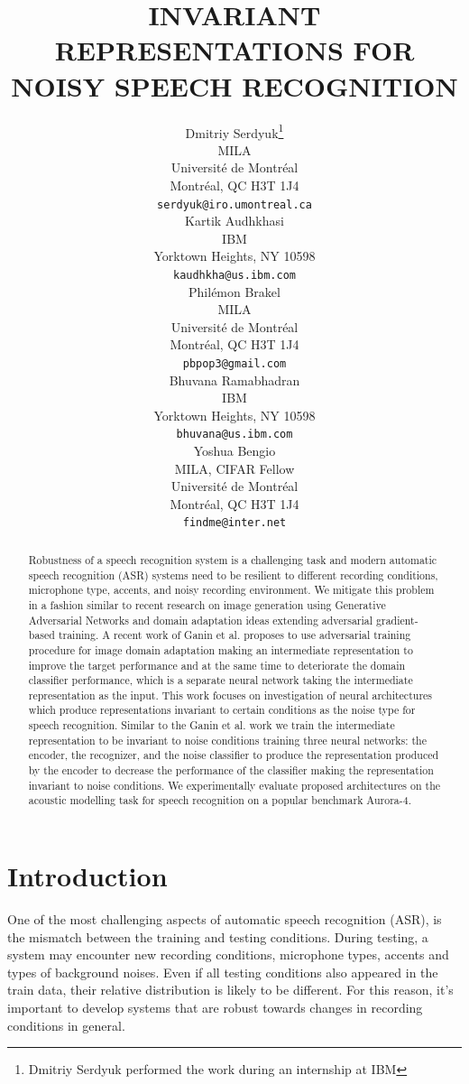 \documentclass{article}
\title{INVARIANT REPRESENTATIONS FOR NOISY SPEECH RECOGNITION}
\author{
  Dmitriy Serdyuk\thanks{Dmitriy Serdyuk performed the work 
    during an internship at IBM} \\
  MILA\\
  Universit\'e de Montr\'eal\\
  Montr\'eal, QC H3T 1J4 \\
  \texttt{serdyuk@iro.umontreal.ca} \\
  \And
  Kartik Audhkhasi \\
  IBM \\
  Yorktown Heights, NY 10598\\
  \texttt{kaudhkha@us.ibm.com} \\
  \And
  Phil\'emon Brakel \\
  MILA\\
  Universit\'e de Montr\'eal\\
  Montr\'eal, QC H3T 1J4 \\
  \texttt{pbpop3@gmail.com} \\
  \And
  Bhuvana Ramabhadran\\
  IBM \\
  Yorktown Heights, NY 10598\\
  \texttt{bhuvana@us.ibm.com} \\
  \And
  Yoshua Bengio\\
  MILA, CIFAR Fellow\\
  Universit\'e de Montr\'eal\\
  Montr\'eal, QC H3T 1J4 \\
  \texttt{findme@inter.net} \\
}
\begin{document}
%
\maketitle
%
\begin{abstract}
    Robustness of a speech recognition system is a challenging task and modern
    automatic speech recognition (ASR) systems need to be resilient to different recording conditions,
    microphone type, accents, and noisy recording environment. We mitigate
    this problem in a fashion similar to recent research on image generation using
    Generative Adversarial Networks and domain adaptation ideas extending
    adversarial gradient-based training. A recent work of Ganin et al. proposes to
    use adversarial training procedure for image domain adaptation making an intermediate
    representation to improve the target performance and at the same time
    to deteriorate the domain classifier performance, which is a separate neural
    network taking the intermediate representation as the input.
    This work focuses on investigation of neural architectures which produce
    representations invariant to certain conditions as the noise type for speech
    recognition. Similar
    to the Ganin et al. work we train the intermediate representation to be invariant
    to noise conditions training three neural networks: the encoder, the recognizer, and the
    noise classifier to produce the representation produced by the encoder to decrease
    the performance of the classifier making the representation invariant to noise conditions. We
    experimentally evaluate proposed architectures on the acoustic modelling task
    for speech recognition on a popular benchmark Aurora-4.
\end{abstract}
%
%
\section{Introduction}
\label{sec:intro}
    One of the most challenging aspects of automatic speech recognition (ASR),
    is the mismatch between the training and testing conditions. During
    testing, a system may encounter new recording conditions, microphone types,
    accents and types of background noises. Even if all testing conditions also appeared
    in the train data, their relative distribution is likely to be
    different. For this reason, it's important to develop systems that are
    robust towards changes in recording conditions in general.
\end{document}

